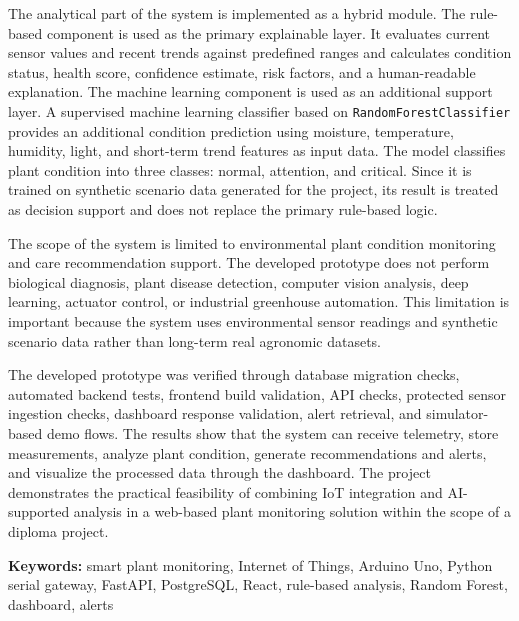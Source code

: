 The analytical part of the system is implemented as a hybrid module. The rule-based component is used as the primary explainable layer. It evaluates current sensor values and recent trends against predefined ranges and calculates condition status, health score, confidence estimate, risk factors, and a human-readable explanation. The machine learning component is used as an additional support layer. A supervised machine learning classifier based on \texttt{RandomForestClassifier} provides an additional condition prediction using moisture, temperature, humidity, light, and short-term trend features as input data. The model classifies plant condition into three classes: normal, attention, and critical. Since it is trained on synthetic scenario data generated for the project, its result is treated as decision support and does not replace the primary rule-based logic.

The scope of the system is limited to environmental plant condition monitoring and care recommendation support. The developed prototype does not perform biological diagnosis, plant disease detection, computer vision analysis, deep learning, actuator control, or industrial greenhouse automation. This limitation is important because the system uses environmental sensor readings and synthetic scenario data rather than long-term real agronomic datasets.

The developed prototype was verified through database migration checks, automated backend tests, frontend build validation, API checks, protected sensor ingestion checks, dashboard response validation, alert retrieval, and simulator-based demo flows. The results show that the system can receive telemetry, store measurements, analyze plant condition, generate recommendations and alerts, and visualize the processed data through the dashboard. The project demonstrates the practical feasibility of combining IoT integration and AI-supported analysis in a web-based plant monitoring solution within the scope of a diploma project.

\noindent\textbf{Keywords:} smart plant monitoring, Internet of Things, Arduino Uno, Python serial gateway, FastAPI, PostgreSQL, React, rule-based analysis, Random Forest, dashboard, alerts